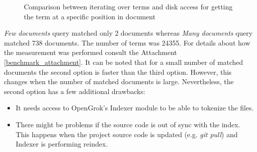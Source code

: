 \begin{figure}[htbp]
    \centering
    \caption{Comparison between iterating over terms and disk access for getting the term at a specific position in document}
    \label{comp_phrase}
\end{figure}

\textit{Few documents} query matched only 2 documents whereas \textit{Many documents} query matched 738 documents.
The number of terms was 24355. For details about how the measurement was performed consult the Attachment
\ref{benchmark_attachment}.
It can be noted that for a small number of matched documents the second option is
faster than the third option. However, this changes when the number of matched documents is large. Nevertheless,
the second option has a few additional drawbacks:
\begin{itemize}
    \item It needs access to OpenGrok's Indexer module to be able to tokenize the files.
    \item There might be problems if the source code is out of sync with the index. This happens when the project source code
    is updated (e.g. \textit{git pull}) and Indexer is performing reindex.
\end{itemize}

